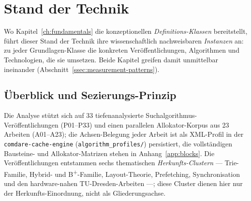 \chapter{Stand der Technik}\label{ch:sota}

Wo Kapitel~\ref{ch:fundamentals} die konzeptionellen \emph{Definitions-Klassen} bereitstellt, führt
dieser Stand der Technik ihre wissenschaftlich nachweisbaren \emph{Instanzen} an: zu jeder
Grundlagen-Klasse die konkreten Veröffentlichungen, Algorithmen und Technologien, die sie umsetzen.
Beide Kapitel greifen damit unmittelbar ineinander (Abschnitt~\ref{ssec:measurement-patterns}).

\section{Überblick und Sezierungs-Prinzip}\label{sec:sota-overview}
Die Analyse stützt sich auf 33 tiefenanalysierte Suchalgorithmus-Veröffentlichungen (P01--P33) und
einen parallelen Allokator-Korpus aus 23 Arbeiten (A01--A23); die Achsen-Belegung jeder Arbeit ist
als XML-Profil in der \texttt{comdare-cache-engine} (\texttt{algorithm\_profiles/}) persistiert, die
vollständigen Bausteine- und Allokator-Matrizen stehen in Anhang~\ref{app:blocks}. Die
Veröffentlichungen entstammen sechs thematischen \emph{Herkunfts-Clustern} --- Trie-Familie, Hybrid-
und B\textsuperscript{+}-Familie, Layout-Theorie, Prefetching, Synchronisation und den
hardware-nahen TU-Dresden-Arbeiten ---; diese Cluster dienen hier nur der Herkunfts-Einordnung,
nicht als Gliederungsachse.

